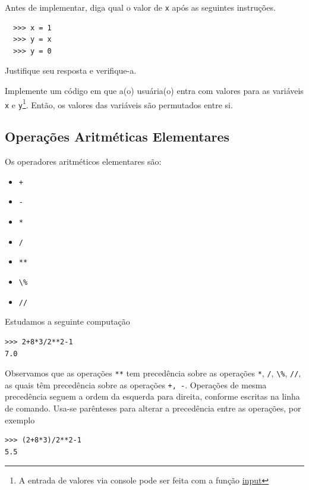 \documentclass[12pt]{article}
\begin{document}
\begin{exr}
  Antes de implementar, diga qual o valor de \lstinline+x+ após as seguintes instruções.
  \begin{lstlisting}
  >>> x = 1
  >>> y = x
  >>> y = 0
  \end{lstlisting}
  Justifique seu resposta e verifique-a.
\end{exr}

\begin{exr}
  Implemente um código em que a(o) usuária(o) entra com valores para as variáveis \lstinline+x+ e \lstinline+y+\footnote{A entrada de valores via console pode ser feita com a função \href{https://docs.python.org/3/library/functions.html\#input}{input}}. Então, os valores das variáveis são permutados entre si.
\end{exr}

\subsection{Operações Aritméticas Elementares}

Os operadores aritméticos elementares são:
\begin{itemize}
\item[] \lstinline-+- 
\item[] \lstinline+-+ 
\item[] \lstinline+*+ 
\item[] \lstinline+/+ 
\item[] \lstinline+**+ 
\item[] \lstinline+\%+ 
\item[] \lstinline+//+ 
\end{itemize}

\begin{ex}
  Estudamos a seguinte computação
\begin{lstlisting}
>>> 2+8*3/2**2-1
7.0
\end{lstlisting}
  Observamos que as operações \lstinline+**+ tem precedência sobre as operações \lstinline+*+, \lstinline+/+, \lstinline+\%+, \lstinline+//+, as quais têm precedência sobre as operações \lstinline!+, -!. Operações de mesma precedência seguem a ordem da esquerda para direita, conforme escritas na linha de comando. Usa-se parênteses para alterar a precedência entre as operações, por exemplo
\begin{lstlisting}
>>> (2+8*3)/2**2-1
5.5
\end{lstlisting}
\end{ex}
\end{document}
